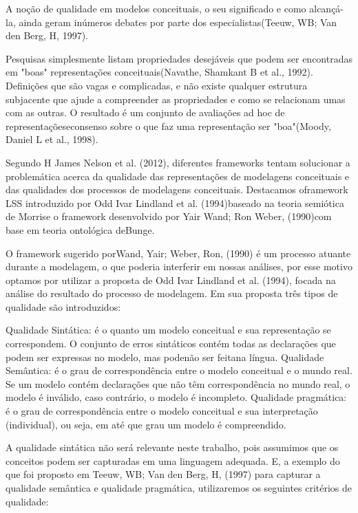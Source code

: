 A noção de qualidade em modelos conceituais, o seu significado e como alcançá-la, ainda geram inúmeros debates por parte dos especialistas(Teeuw, WB; Van den Berg, H, 1997).

Pesquisas simplesmente listam propriedades desejáveis que podem ser encontradas em "boas" representações conceituais(Navathe, Shamkant B et al., 1992). Definições que são vagas e complicadas, e não existe qualquer estrutura subjacente que ajude a compreender as propriedades e como se relacionam umas com as outras. O resultado é um conjunto de avaliações ad hoc de representaçõeseconsenso sobre o que faz uma representação ser "boa"(Moody, Daniel L et al., 1998).

Segundo H James Nelson et al. (2012), diferentes frameworks tentam solucionar a problemática acerca da qualidade das representações de modelagens conceituais e das qualidades dos processos de modelagens conceituais. Destacamos oframework LSS introduzido por Odd Ivar Lindland et al. (1994)baseado na teoria semiótica de Morrise o framework desenvolvido por Yair Wand; Ron Weber, (1990)com base em teoria ontológica deBunge.

O framework sugerido porWand, Yair; Weber, Ron, (1990) é um processo atuante durante a modelagem, o que poderia interferir em nossas análises, por esse motivo optamos por utilizar a proposta de Odd Ivar Lindland et al. (1994), focada na análise do resultado do processo de modelagem. Em sua proposta três tipos de qualidade são introduzidos:

Qualidade Sintática: é o quanto um modelo conceitual e sua representação se correspondem. O conjunto de erros sintáticos contém todas as declarações que podem ser expressas no modelo, mas podenão ser feitana língua.
Qualidade Semântica: é o grau de correspondência entre o modelo conceitual e o mundo real. Se um modelo contém declarações que não têm correspondência no mundo real, o modelo é inválido, caso contrário, o modelo é incompleto.
Qualidade pragmática: é o grau de correspondência entre o modelo conceitual e sua interpretação (individual), ou seja, em até que grau um modelo é compreendido.

A qualidade sintática não será relevante neste trabalho, pois assumimos que os conceitos podem ser capturadas em uma linguagem adequada. E, a exemplo do que foi proposto em Teeuw, WB; Van den Berg, H, (1997) para capturar a qualidade semântica e qualidade pragmática, utilizaremos os seguintes critérios de qualidade:

